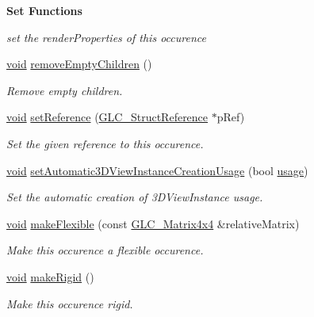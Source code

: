 \begin{Indent}{\bf Set Functions}
\begin{DoxyCompactItemize}
\begin{DoxyCompactList}\small\item\em set the render\-Properties of this occurence \end{DoxyCompactList}\item 
\hyperlink{group___u_a_v_objects_plugin_ga444cf2ff3f0ecbe028adce838d373f5c}{void} \hyperlink{class_g_l_c___struct_occurence_a6647022fdd2bcc3acc37294ef0fd6496}{remove\-Empty\-Children} ()
\begin{DoxyCompactList}\small\item\em Remove empty children. \end{DoxyCompactList}\item 
\hyperlink{group___u_a_v_objects_plugin_ga444cf2ff3f0ecbe028adce838d373f5c}{void} \hyperlink{class_g_l_c___struct_occurence_ad1ebf71ca68f7fa73723f5e606eee036}{set\-Reference} (\hyperlink{class_g_l_c___struct_reference}{G\-L\-C\-\_\-\-Struct\-Reference} $\ast$p\-Ref)
\begin{DoxyCompactList}\small\item\em Set the given reference to this occurence. \end{DoxyCompactList}\item 
\hyperlink{group___u_a_v_objects_plugin_ga444cf2ff3f0ecbe028adce838d373f5c}{void} \hyperlink{class_g_l_c___struct_occurence_ae036acdd4ebf53bffddfcf3639a70a2e}{set\-Automatic3\-D\-View\-Instance\-Creation\-Usage} (bool \hyperlink{glext_8h_ae759ed0394ed5353d8bef2fb755305da}{usage})
\begin{DoxyCompactList}\small\item\em Set the automatic creation of 3\-D\-View\-Instance usage. \end{DoxyCompactList}\item 
\hyperlink{group___u_a_v_objects_plugin_ga444cf2ff3f0ecbe028adce838d373f5c}{void} \hyperlink{class_g_l_c___struct_occurence_a682653eafa8117142ded5cab08a5cf11}{make\-Flexible} (const \hyperlink{class_g_l_c___matrix4x4}{G\-L\-C\-\_\-\-Matrix4x4} \&relative\-Matrix)
\begin{DoxyCompactList}\small\item\em Make this occurence a flexible occurence. \end{DoxyCompactList}\item 
\hyperlink{group___u_a_v_objects_plugin_ga444cf2ff3f0ecbe028adce838d373f5c}{void} \hyperlink{class_g_l_c___struct_occurence_ac2e63627b3114ece31001829aaaf5f93}{make\-Rigid} ()
\begin{DoxyCompactList}\small\item\em Make this occurence rigid. \end{DoxyCompactList}\end{DoxyCompactItemize}
\end{Indent}
